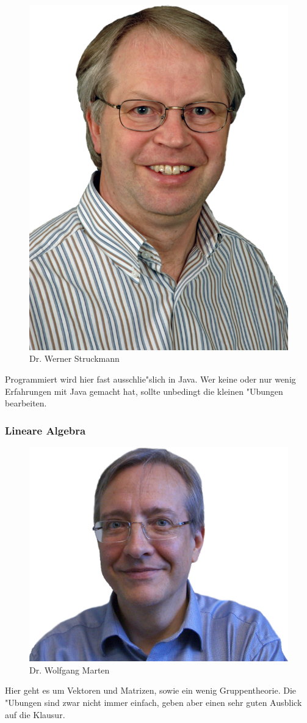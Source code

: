 \begin{figure}[h]
	\centering\includegraphics[width=0.7\linewidth]{bilder/dozenten/struck.png}\\
	{Dr. Werner Struckmann}
\end{figure}
Programmiert wird hier fast ausschlie"slich in Java. Wer keine oder nur wenig Erfahrungen mit Java gemacht hat, sollte unbedingt die kleinen "Ubungen bearbeiten.


\subsubsection{Lineare Algebra}

\begin{figure}[h]
	\centering\includegraphics[width=0.7\linewidth]{bilder/dozenten/marten_frei.png}\\
	{Dr. Wolfgang Marten}
\end{figure}
Hier geht es um Vektoren und Matrizen, sowie ein wenig Gruppentheorie. Die
"Ubungen sind zwar nicht immer einfach, geben aber einen sehr guten Ausblick auf die Klausur.

